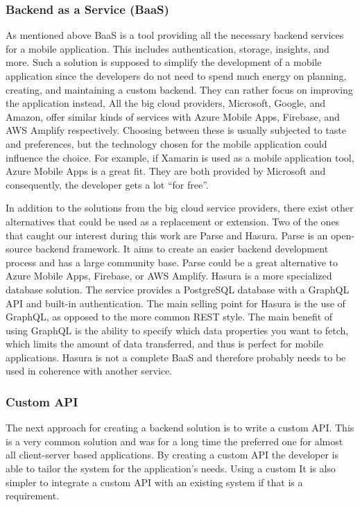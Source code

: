 \documentclass[../Main.tex]{subfiles}
\begin{document}
\subsubsection{Backend as a Service (BaaS)}
As mentioned above BaaS is a tool providing all the necessary backend services for a mobile application. This includes authentication, storage, insights, and more. Such a solution is supposed to simplify the development of a mobile application since the developers do not need to spend much energy on planning, creating, and maintaining a custom backend. They can rather focus on improving the application instead, All the big cloud providers, Microsoft, Google, and Amazon, offer similar kinds of services with Azure Mobile Apps, Firebase, and AWS Amplify respectively. Choosing between these is usually subjected to taste and preferences, but the technology chosen for the mobile application could influence the choice. For example, if Xamarin is used as a mobile application tool, Azure Mobile Apps is a great fit. They are both provided by Microsoft and consequently, the developer gets a lot “for free”.

In addition to the solutions from the big cloud service providers, there exist other alternatives that could be used as a replacement or extension. Two of the ones that caught our interest during this work are Parse and Hasura. Parse is an open-source backend framework. It aims to create an easier backend development process and has a large community base. Parse could be a great alternative to Azure Mobile Apps, Firebase, or AWS Amplify. Hasura is a more specialized database solution. The service provides a PostgreSQL database with a GraphQL API and built-in authentication. The main selling point for Hasura is the use of GraphQL, as opposed to the more common REST style. The main benefit of using GraphQL is the ability to specify which data properties you want to fetch, which limits the amount of data transferred, and thus is perfect for mobile applications. Hasura is not a complete BaaS and therefore probably needs to be used in coherence with another service.

\subsubsection{Custom API}
The next approach for creating a backend solution is to write a custom API. This is a very common solution and was for a long time the preferred one for almost all client-server based applications. By creating a custom API the developer is able to tailor the system for the application’s needs. Using a custom It is also simpler to integrate a custom API with an existing system if that is a requirement. 
\end{document}
